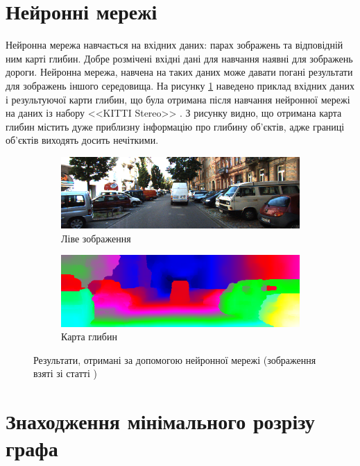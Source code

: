 \section{Нейронні мережі}

Нейронна мережа навчається на вхідних даних:
парах зображень та відповідній ним карті глибин.
Добре розмічені вхідні дані для навчання
наявні для зображень дороги.
Нейронна мережа, навчена на таких даних може давати погані результати для
зображень іншого середовища.
На рисунку \ref{fig:overview:luo:nn}
наведено приклад вхідних даних і результуючої карти глибин,
що була отримана після навчання нейронної мережі на даних із набору
<<KITTI Stereo>> \cite{overview:geiger:nn}.
З рисунку видно,
що отримана карта глибин містить дуже приблизну інформацію про глибину об'єктів,
адже границі об'єктів виходять досить нечіткими.

\begin{figure}[h]
  \centering
  \begin{subfigure}[b]{0.49\textwidth}
      \includegraphics[width=\textwidth]{images/overview_luo_nn_left}
      \caption{Ліве зображення}
  \end{subfigure}
  \hfill
  \begin{subfigure}[b]{0.49\textwidth}
      \includegraphics[width=\textwidth]{images/overview_luo_nn_result}
      \caption{Карта глибин}
  \end{subfigure}
  \caption{Результати,
           отримані за допомогою нейронної мережі
           (зображення взяті зі статті \cite{overview:luo:nn})}
  \label{fig:overview:luo:nn}
\end{figure}

\section{Знаходження мінімального розрізу графа}

